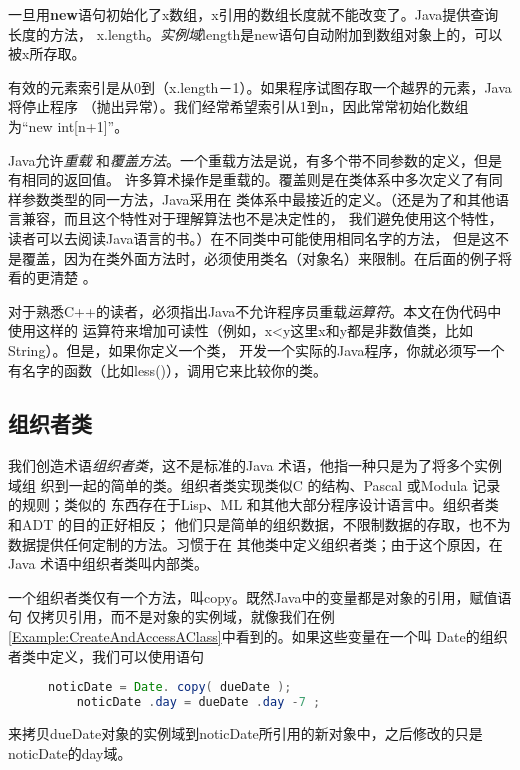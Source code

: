 一旦用\textbf{new}语句初始化了x数组，x引用的数组长度就不能改变了。Java提供查询长度的方法，
x.length。\emph{实例域}length是new语句自动附加到数组对象上的，可以被x所存取。

有效的元素索引是从0到（x.length－1）。如果程序试图存取一个越界的元素，Java将停止程序
（抛出异常）。我们经常希望索引从1到n，因此常常初始化数组为“new
int[n+1]”。

Java允许\emph{重载}
和\emph{覆盖方法}。一个重载方法是说，有多个带不同参数的定义，但是有相同的返回值。
许多算术操作是重载的。覆盖则是在类体系中多次定义了有同样参数类型的同一方法，Java采用在
类体系中最接近的定义。（还是为了和其他语言兼容，而且这个特性对于理解算法也不是决定性的，
我们避免使用这个特性，读者可以去阅读Java语言的书。）在不同类中可能使用相同名字的方法，
但是这不是覆盖，因为在类外面方法时，必须使用类名（对象名）来限制。在后面的例子将看的更清楚
。

对于熟悉C++的读者，必须指出Java不允许程序员重载\emph{运算符}。本文在伪代码中使用这样的
运算符来增加可读性（例如，x<y这里x和y都是非数值类，比如String）。但是，如果你定义一个类，
开发一个实际的Java程序，你就必须写一个有名字的函数（比如less()），调用它来比较你的类。


\subsection{组织者类}\label{Sec:OrganizerClass}
我们创造术语\emph{组织者类}，这不是标准的Java
术语，他指一种只是为了将多个实例域组
织到一起的简单的类。组织者类实现类似C 的结构、Pascal 或Modula
记录的规则；类似的 东西存在于Lisp、ML
和其他大部分程序设计语言中。组织者类和ADT 的目的正好相反；
他们只是简单的组织数据，不限制数据的存取，也不为数据提供任何定制的方法。习惯于在
其他类中定义组织者类；由于这个原因，在Java 术语中组织者类叫内部类。

一个组织者类仅有一个方法，叫copy。既然Java中的变量都是对象的引用，赋值语句
仅拷贝引用，而不是对象的实例域，就像我们在例\ref{Example:CreateAndAccessAClass}中看到的。如果这些变量在一个叫
Date的组织者类中定义，我们可以使用语句
\begin{figure}
\begin{lstlisting}[language={Java}]
    noticDate = Date. copy( dueDate );
    noticDate .day = dueDate .day -7 ;
\end{lstlisting}
\end{figure}
\noindent
来拷贝dueDate对象的实例域到noticDate所引用的新对象中，之后修改的只是noticDate的day域。

